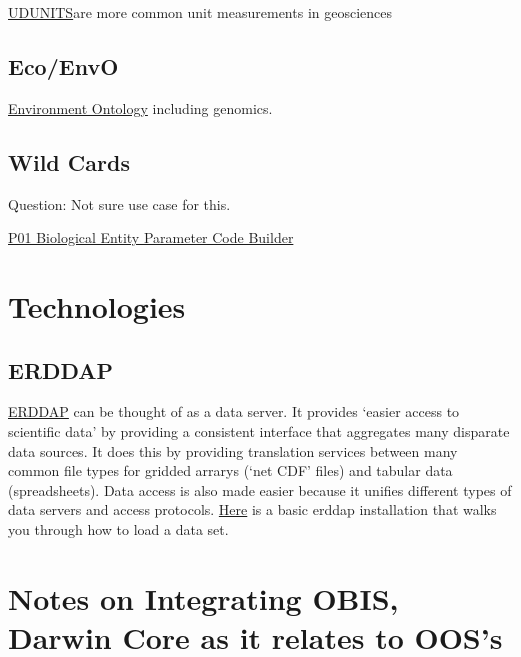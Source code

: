 \documentclass[]{book}
\begin{document}
\href{https://www.unidata.ucar.edu/software/udunits/}{UDUNITS}are more common unit measurements in geosciences

\hypertarget{ecoenvo}{%
\subsection{Eco/EnvO}\label{ecoenvo}}

\href{\%22http://www.obofoundry.org/ontology/envo.html\%22}{Environment Ontology} including genomics.

\hypertarget{wild-cards}{%
\subsection{Wild Cards}\label{wild-cards}}

Question: Not sure use case for this.

\href{\%22https://www.bodc.ac.uk/resources/vocabularies/vocabulary_builder/biomodel/\%22}{P01 Biological Entity Parameter Code Builder}

\hypertarget{technologies}{%
\section{Technologies}\label{technologies}}

\hypertarget{erddap}{%
\subsection{ERDDAP}\label{erddap}}

\href{\%22https://coastwatch.pfeg.noaa.gov/erddap/index.html\%22}{ERDDAP} can be thought of as a data server. It provides `easier access to scientific data' by providing a consistent interface that aggregates many disparate data sources. It does this by providing translation services between many common file types for gridded arrarys (`net CDF' files) and tabular data (spreadsheets). Data access is also made easier because it unifies different types of data servers and access protocols. \href{\%22https://github.com/HakaiInstitute/erddap-basic\%22}{Here} is a basic erddap installation that walks you through how to load a data set.

\hypertarget{notes-on-integrating-obis-darwin-core-as-it-relates-to-ooss}{%
\section{Notes on Integrating OBIS, Darwin Core as it relates to OOS's}\label{notes-on-integrating-obis-darwin-core-as-it-relates-to-ooss}}
\end{document}
